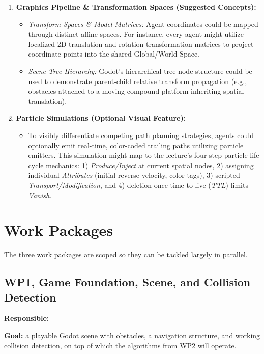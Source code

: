 \documentclass[11pt,a4paper]{article}
\begin{document}
\begin{enumerate}[leftmargin=1.4em]
  \item \textbf{Graphics Pipeline \& Transformation Spaces (Suggested Concepts):} 
  \begin{itemize}
    \item \textit{Transform Spaces \& Model Matrices:} Agent coordinates could be mapped through distinct affine spaces. For instance, every agent might utilize localized 2D translation and rotation transformation matrices to project coordinate points into the shared Global/World Space.
    \item \textit{Scene Tree Hierarchy:} Godot's hierarchical tree node structure could be used to demonstrate parent-child relative transform propagation (e.g., obstacles attached to a moving compound platform inheriting spatial translation).
  \end{itemize}
  
  \item \textbf{Particle Simulations (Optional Visual Feature):} 
  \begin{itemize}
    \item To visibly differentiate competing path planning strategies, agents could optionally emit real-time, color-coded trailing paths utilizing particle emitters. This simulation might map to the lecture's four-step particle life cycle mechanics: 1) \textit{Produce/Inject} at current spatial nodes, 2) assigning individual \textit{Attributes} (initial reverse velocity, color tags), 3) scripted \textit{Transport/Modification}, and 4) deletion once time-to-live (\textit{TTL}) limits \textit{Vanish}.
  \end{itemize}
\end{enumerate}

\newpage

\section{Work Packages}

The three work packages are scoped so they can be tackled largely in
parallel. 

\subsection*{WP1, Game Foundation, Scene, and Collision Detection}

\textbf{Responsible:} \underline{\hspace{4cm}}

\textbf{Goal:} a playable Godot scene with obstacles, a navigation
structure, and working collision detection, on top of which the
algorithms from WP2 will operate.
\end{document}

